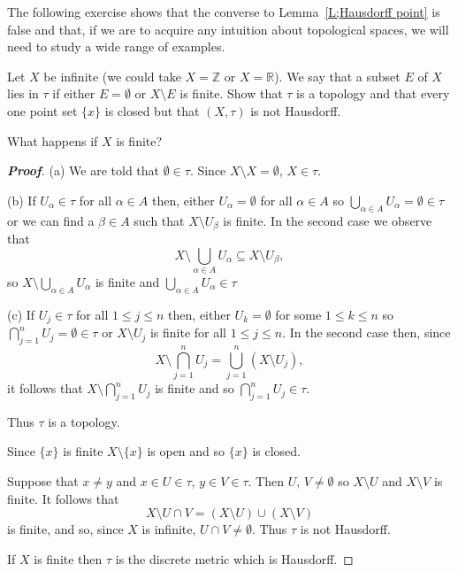 The following exercise shows that the converse 
to Lemma~\ref{L;Hausdorff point} is false
and that, if we are to acquire any intuition about
topological spaces, we will need to study a wide range
of examples.


\begin{theorem}\label{T;finite complement} 
Let $X$ be infinite (we could take $X={\mathbb Z}$ or $X={\mathbb R}$). We say that a subset $E$ of $X$ lies in $\tau$ if either $E=\emptyset$ or $X\setminus E$ is finite. Show that $\tau$ is a topology and that every one point set $\{x\}$ is closed but that $(X,\tau)$ is not Hausdorff.

What happens if $X$ is finite?
\end{theorem}

\begin{proof}[\bf Proof] (a) We are told that $\emptyset\in \tau$.
Since $X\setminus X=\emptyset$, $X\in\tau$.

(b) If $U_{\alpha}\in\tau$ for all $\alpha\in A$ then,
either $U_{\alpha}=\emptyset$ for all $\alpha\in A$
so $\bigcup_{\alpha\in A}U_{\alpha}=\emptyset\in\tau$
or we can find a $\beta\in A$ such that 
$X\setminus U_{\beta}$ is finite.
In the second case we observe that
\[X\setminus\bigcup_{\alpha\in A}U_{\alpha}
\subseteq X\setminus U_{\beta},\]so
$X\setminus\bigcup_{\alpha\in A}U_{\alpha}$
is finite and
$\bigcup_{\alpha\in A}U_{\alpha}\in\tau$

(c) If $U_{j}\in\tau$ for all $1\leq j\leq n$ then,
either $U_{k}=\emptyset$ for some $1\leq k\leq n$
so $\bigcap_{j=1}^{n}U_{j}=\emptyset\in\tau$
or $X\setminus U_{j}$ is finite for all $1\leq j\leq n$.
In the second case then, since
\[X\setminus \bigcap_{j=1}^{n}U_{j}
=\bigcup_{j=1}^{n}(X\setminus U_{j}),\]
it follows that
$X\setminus \bigcap_{j=1}^{n}U_{j}$ is finite
and so $\bigcap_{j=1}^{n}U_{j}\in\tau$.

Thus $\tau$ is a topology.

Since $\{x\}$ is finite $X\setminus\{x\}$ is open
and so $\{x\}$ is closed.

Suppose that $x \neq y$ and $x\in U\in\tau$,
$y\in V\in \tau$. Then $U,\,V\neq\emptyset$
so $X\setminus U$ and $X\setminus V$ is finite.
It follows that
\[X\setminus U\cap V=(X\setminus U)\cup(X\setminus V)\]
is finite, and so, since $X$ is infinite, $U\cap V\neq\emptyset$.
Thus $\tau$ is not Hausdorff.

If $X$ is finite then $\tau$ is the discrete metric
which is Hausdorff.
\end{proof}


